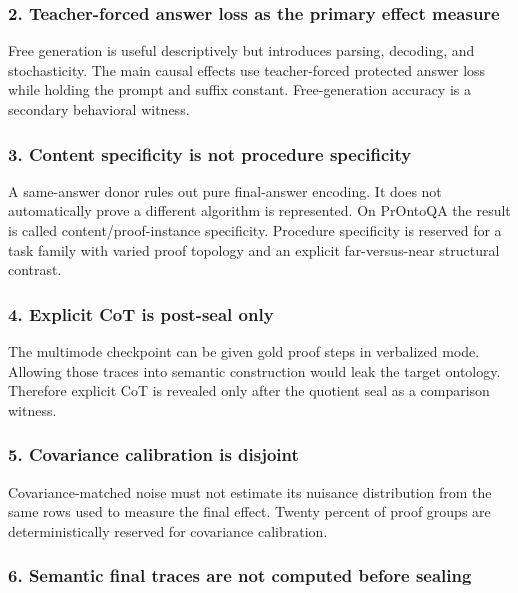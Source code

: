 \documentclass[
  10pt,
]{article}
\begin{document}
\subsubsection{2. Teacher-forced answer loss as the primary effect
measure}\label{teacher-forced-answer-loss-as-the-primary-effect-measure}

Free generation is useful descriptively but introduces parsing,
decoding, and stochasticity. The main causal effects use teacher-forced
protected answer loss while holding the prompt and suffix constant.
Free-generation accuracy is a secondary behavioral witness.

\subsubsection{3. Content specificity is not procedure
specificity}\label{content-specificity-is-not-procedure-specificity}

A same-answer donor rules out pure final-answer encoding. It does not
automatically prove a different algorithm is represented. On PrOntoQA
the result is called content/proof-instance specificity. Procedure
specificity is reserved for a task family with varied proof topology and
an explicit far-versus-near structural contrast.

\subsubsection{4. Explicit CoT is post-seal
only}\label{explicit-cot-is-post-seal-only}

The multimode checkpoint can be given gold proof steps in verbalized
mode. Allowing those traces into semantic construction would leak the
target ontology. Therefore explicit CoT is revealed only after the
quotient seal as a comparison witness.

\subsubsection{5. Covariance calibration is
disjoint}\label{covariance-calibration-is-disjoint}

Covariance-matched noise must not estimate its nuisance distribution
from the same rows used to measure the final effect. Twenty percent of
proof groups are deterministically reserved for covariance calibration.

\subsubsection{6. Semantic final traces are not computed before
sealing}\label{semantic-final-traces-are-not-computed-before-sealing}
\end{document}
